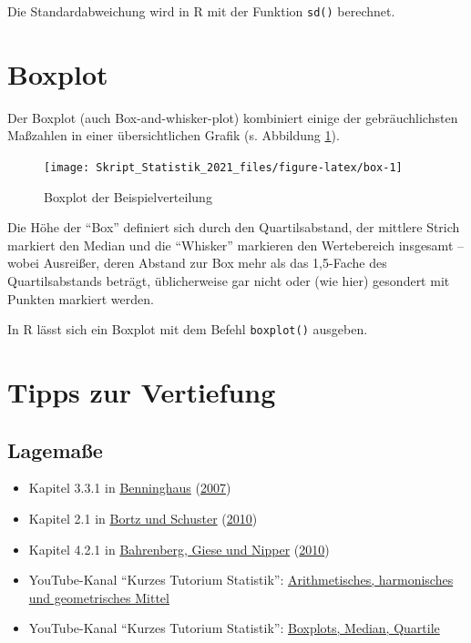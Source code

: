 \documentclass[
  11pt,
  ngerman,
  a4paper,
]{report}
\providecommand{\tightlist}{%
  \setlength{\itemsep}{0pt}\setlength{\parskip}{0pt}}
\newenvironment{rtip}{
  \medskip
  \begin{tcolorbox}[colframe=purple,colback=light_gray,title=Softwarehinweis]
}{
  \end{tcolorbox}
  \medskip
}
\begin{document}
\begin{rtip}
Die Standardabweichung wird in R mit der Funktion \verb|sd()| berechnet.
\end{rtip}

\hypertarget{boxplot}{%
\section{Boxplot}\label{boxplot}}

Der Boxplot (auch Box-and-whisker-plot) kombiniert einige der gebräuchlichsten Maßzahlen in einer übersichtlichen Grafik (s. Abbildung \ref{fig:box}).

\begin{figure}[!h]

{\centering \texttt{[image: Skript\_Statistik\_2021\_files/figure-latex/box-1]} 

}

\caption{Boxplot der Beispielverteilung}\label{fig:box}
\end{figure}

Die Höhe der \enquote{Box} definiert sich durch den Quartilsabstand, der mittlere Strich markiert den Median und die \enquote{Whisker} markieren den Wertebereich insgesamt -- wobei Ausreißer, deren Abstand zur Box mehr als das 1,5-Fache des Quartilsabstands beträgt, üblicherweise gar nicht oder (wie hier) gesondert mit Punkten markiert werden.

\begin{rtip}
In R lässt sich ein Boxplot mit dem Befehl \verb|boxplot()| ausgeben.
\end{rtip}

\hypertarget{tipps-zur-vertiefung-1}{%
\section*{Tipps zur Vertiefung}\label{tipps-zur-vertiefung-1}}

\hypertarget{lagemauxdfe-1}{%
\subsection{Lagemaße}\label{lagemauxdfe-1}}

\begin{itemize}
\tightlist
\item
  Kapitel 3.3.1 in \protect\hyperlink{ref-benninghaus}{Benninghaus} (\protect\hyperlink{ref-benninghaus}{2007})
\item
  Kapitel 2.1 in \protect\hyperlink{ref-bortz}{Bortz und Schuster} (\protect\hyperlink{ref-bortz}{2010})
\item
  Kapitel 4.2.1 in \protect\hyperlink{ref-bahrenberg}{Bahrenberg, Giese und Nipper} (\protect\hyperlink{ref-bahrenberg}{2010})
\item
  YouTube-Kanal \enquote{Kurzes Tutorium Statistik}: \href{https://www.youtube.com/watch?v=Kx9aHOMVPEg}{Arithmetisches, harmonisches und geometrisches Mittel}
\item
  YouTube-Kanal \enquote{Kurzes Tutorium Statistik}: \href{https://www.youtube.com/watch?v=HsDeAoBOyS4}{Boxplots, Median, Quartile}
\end{itemize}
\end{document}
